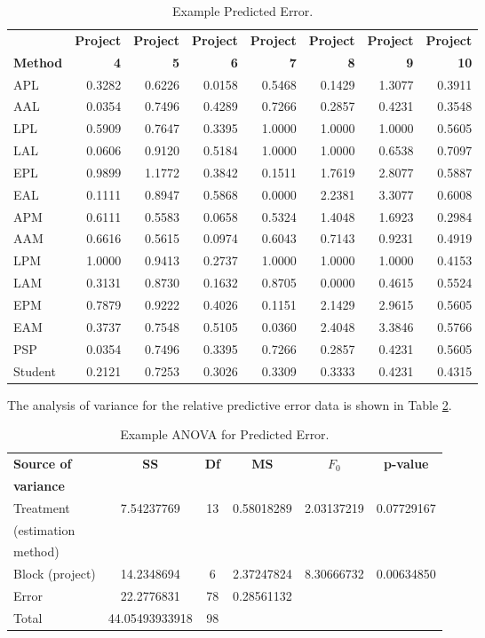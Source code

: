 \begin{table}[htbp]
  \caption{Example Predicted Error.}  
  \label{tab:exampleerror}
  \begin{tabular}{|l|r|r|r|r|r|r|r|} \hline
    &{\bf Project}&{\bf Project}&{\bf Project}&{\bf Project}&{\bf Project}&{\bf
      Project}&{\bf Project} \\ 
    {\bf Method}&{\bf 4}&{\bf 5}&{\bf 6}&{\bf 7}&{\bf 8}&{\bf 9}&{\bf 10}\\ \hline
    APL&0.3282&0.6226&0.0158&0.5468&0.1429&1.3077&0.3911\\ \hline
    AAL&0.0354&0.7496&0.4289&0.7266&0.2857&0.4231&0.3548\\ \hline
    LPL&0.5909&0.7647&0.3395&1.0000&1.0000&1.0000&0.5605\\ \hline
    LAL&0.0606&0.9120&0.5184&1.0000&1.0000&0.6538&0.7097\\ \hline
    EPL&0.9899&1.1772&0.3842&0.1511&1.7619&2.8077&0.5887\\ \hline
    EAL&0.1111&0.8947&0.5868&0.0000&2.2381&3.3077&0.6008\\ \hline
    APM&0.6111&0.5583&0.0658&0.5324&1.4048&1.6923&0.2984\\ \hline
    AAM&0.6616&0.5615&0.0974&0.6043&0.7143&0.9231&0.4919\\ \hline
    LPM&1.0000&0.9413&0.2737&1.0000&1.0000&1.0000&0.4153\\ \hline
    LAM&0.3131&0.8730&0.1632&0.8705&0.0000&0.4615&0.5524\\ \hline
    EPM&0.7879&0.9222&0.4026&0.1151&2.1429&2.9615&0.5605\\ \hline
    EAM&0.3737&0.7548&0.5105&0.0360&2.4048&3.3846&0.5766\\ \hline
    PSP&0.0354&0.7496&0.3395&0.7266&0.2857&0.4231&0.5605\\ \hline
    Student&0.2121&0.7253&0.3026&0.3309&0.3333&0.4231&0.4315\\ \hline
  \end{tabular}
\end{table}


The analysis of variance for the relative predictive error data is shown in
Table \ref{tab:exampleAnovaPred}.

\begin{table}[htbp]
  \caption{Example ANOVA for Predicted Error.}  
  \label{tab:exampleAnovaPred}
  \begin{tabular}{|l|c|c|c|c|c|} \hline
    {\bf Source of}&{\bf SS}&{\bf Df}&{\bf MS}&{\bf $F_0$}&{\bf p-value} \\ 
    {\bf variance}&&&&& \\ \hline
    Treatment& 7.54237769&13&0.58018289&2.03137219&0.07729167 \\
    (estimation&&&&&\\
    method)&&&&& \\ \hline
    Block (project)&14.2348694&6&2.37247824&8.30666732&0.00634850 \\ \hline
    Error&22.2776831&78&0.28561132&&\\ \hline
    Total&44.05493933918&98&&&\\ \hline
  \end{tabular}
\end{table}

